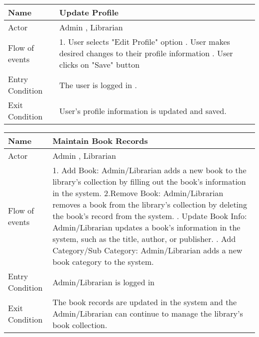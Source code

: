 \begin{center}
\begin{tabular}{ | m{7em} | m{9cm}|}
\end{tabular}

\vspace{1cm}

\begin{tabular}{ | m{7em} | m{9cm}|} 
  \hline
  Name & Update Profile\\ 
  \hline    
  Actor & Admin , Librarian \\ 
  \hline
  Flow of events & 

    1. User selects "Edit Profile" option 
    \newline
    2. User makes desired changes to their profile information
    \newline
    3. User clicks on "Save" button \\
    
  \hline
 
   Entry Condition & The user is logged in .\\
  \hline
  Exit Condition & User's profile information is updated and saved.\\
  \hline

\end{tabular}

\vspace{1cm}

\begin{tabular}{ | m{7em} | m{9cm}|} 
  \hline
  Name & Maintain Book Records\\ 
  \hline    
  Actor & Admin , Librarian \\ 
  \hline
  Flow of events & 

   1. Add Book: Admin/Librarian adds a new book to the library's collection by filling out the book's information in the system.
       \newline
   2.Remove Book: Admin/Librarian removes a book from the library's collection by deleting the book's record from the system.
       \newline
    3. Update Book Info: Admin/Librarian updates a book's information in the system, such as the title, author, or publisher.
        \newline
    4. Add Category/Sub Category: Admin/Librarian adds a new book category to the system. \\
  \hline
  
   Entry Condition & Admin/Librarian is logged in \\
  \hline
  Exit Condition & The book records are updated in the system and the Admin/Librarian can continue to manage the library's book collection.
 \\
  \hline


\end{tabular}
\end{center}
